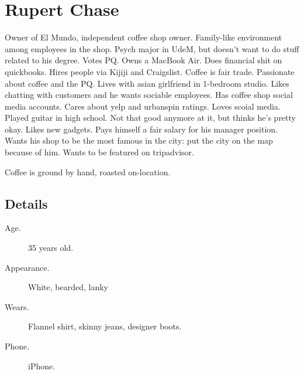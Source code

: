 \documentclass{article}
\begin{document}
\section{Rupert Chase}

Owner of El Mundo, independent coffee shop owner. Family-like environment among employees in the shop. Psych major in UdeM, but doesn't want to do stuff related to his degree. Votes PQ. Owns a MacBook Air. Does financial shit on quickbooks. Hires people via Kijiji and Craigslist. Coffee is fair trade. Passionate about coffee and the PQ. Lives with asian girlfriend in 1-bedroom studio. Likes chatting with customers and he wants sociable employees. Has coffee shop social media accounts. Cares about yelp and urbanspin ratings. Loves scoial media. Played guitar in high school. Not that good anymore at it, but thinks he's pretty okay. Likes new gadgets. Pays himself a fair salary for his manager position. Wants his shop to be the most famous in the city: put the city on the map because of him. Wants to be featured on tripadvisor.

Coffee is ground by hand, roasted on-location.

\subsection{Details}

\begin{description}
    \item[Age.] 35 years old.

    \item[Appearance.] White, bearded, lanky

    \item[Wears.] Flannel shirt, skinny jeans, designer boots.

    \item[Phone.] iPhone.
\end{description}
\end{document}
